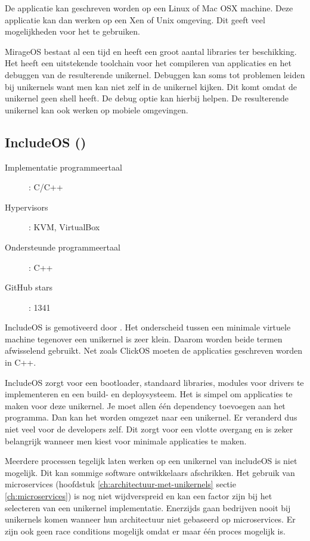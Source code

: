 \documentclass[pdftex,a4paper,12pt,twoside]{report}
\begin{document}
De applicatie kan geschreven worden op een Linux of Mac OSX machine. Deze applicatie kan dan werken op een Xen of Unix omgeving. Dit geeft veel mogelijkheden voor het te gebruiken.

MirageOS bestaat al een tijd en heeft een groot aantal libraries ter beschikking. Het heeft een uitstekende toolchain voor het compileren van applicaties en het debuggen van de resulterende unikernel. Debuggen kan soms tot problemen leiden bij unikernels want men kan niet zelf in de unikernel kijken. Dit komt omdat de unikernel geen shell heeft. De debug optie kan hierbij helpen. De resulterende unikernel kan ook werken op mobiele omgevingen.

\subsection{IncludeOS (\cite{oslo_and_akershus_university_college_hioa-cs/includeos_????})}
\begin{description}
  \item [Implementatie programmeertaal]: C/C++
  \item [Hypervisors]: KVM, VirtualBox
  \item [Ondersteunde programmeertaal]: C++
  \item [GitHub stars]: 1341
\end{description}

IncludeOS is gemotiveerd door \cite{bratterud_maximizing_2013}. Het onderscheid tussen een minimale virtuele machine tegenover een unikernel is zeer klein. Daarom worden beide termen afwisselend gebruikt. Net zoals ClickOS moeten de applicaties geschreven worden in C++.

IncludeOS zorgt voor een bootloader, standaard libraries, modules voor drivers te implementeren en een build- en deploysysteem. Het is simpel om applicaties te maken voor deze unikernel. Je moet allen één dependency toevoegen aan het programma. Dan kan het worden omgezet naar een unikernel. Er veranderd dus niet veel voor de developers zelf. Dit zorgt voor een vlotte overgang en is zeker belangrijk wanneer men kiest voor minimale applicaties te maken.

Meerdere processen tegelijk laten werken op een unikernel van includeOS is niet mogelijk. Dit kan sommige software ontwikkelaars afschrikken. Het gebruik van microservices (hoofdstuk \ref{ch:architectuur-met-unikernels} sectie \ref{ch:microservices}) is nog niet wijdverspreid en kan een factor zijn bij het selecteren van een unikernel implementatie. Enerzijds gaan bedrijven nooit bij unikernels komen wanneer hun architectuur niet gebaseerd op microservices. Er zijn ook geen race conditions mogelijk omdat er maar één proces mogelijk is.
\end{document}
